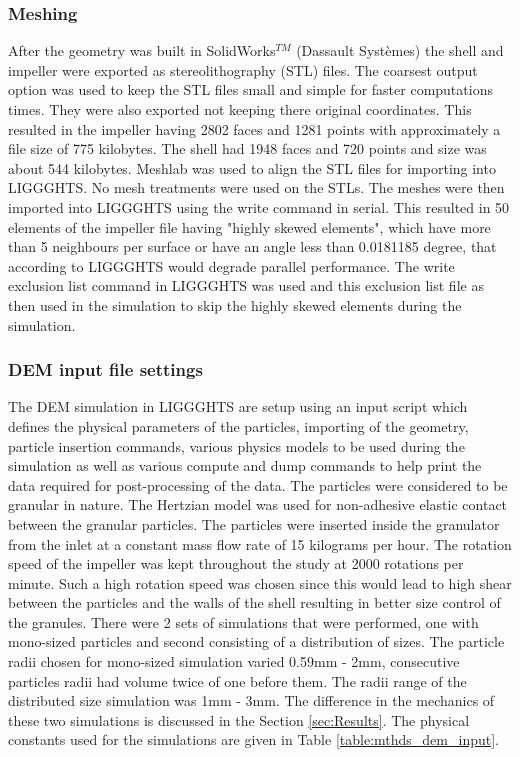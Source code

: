 \documentclass[preprint,11pt,authoryear]{elsarticle}
\begin{document}
\subsubsection{Meshing}
 After the geometry was built in SolidWorks$^{TM}$ (Dassault Syst\`{e}mes) the shell and impeller 
were exported as stereolithography (STL) files. The coarsest output option was used to keep the STL files small and 
simple for faster computations times. They were also exported not keeping there original coordinates.  
This resulted in the impeller having 2802 faces and 1281 points with approximately a file size of 775 
kilobytes. The shell had 1948 faces and 720 points and size was about 544 kilobytes.  
 Meshlab was used to align the STL files for importing into LIGGGHTS. No mesh treatments were 
used on the STLs. 
 The meshes were then imported into LIGGGHTS using the write command in serial. This resulted 
in 50 elements of the impeller file having "highly skewed elements", which have more than 5 
neighbours per surface or have an angle less than 0.0181185 degree, that according to LIGGGHTS 
would degrade parallel performance. The write exclusion list command in LIGGGHTS was used and 
this exclusion list file as then used in the simulation to skip the highly skewed elements during the 
simulation. 

\subsubsection{DEM input file settings}
The DEM simulation in LIGGGHTS are setup using an input script which defines the physical 
parameters of the particles, importing of the geometry, particle insertion commands, various physics 
models to be used during the simulation as well as various compute and dump commands to help print 
the data required for post-processing of the data. The particles were considered to be granular in 
nature. The Hertzian model was used for non-adhesive elastic contact between the granular particles. 
The particles were inserted inside the granulator from the inlet at a constant mass flow rate of 15 
kilograms per hour. The rotation speed of the impeller was kept throughout the study at 2000 rotations 
per minute. Such a high rotation speed was chosen since this would lead to high shear between the 
particles and the walls of the shell resulting in better size control of the granules. There were 2 sets of 
simulations that were performed, one with mono-sized particles and second consisting of a distribution 
of sizes. The particle radii chosen for mono-sized simulation varied 0.59mm - 2mm, consecutive 
particles radii had volume twice of one before them. The radii range of the distributed size simulation 
was 1mm - 3mm. The difference in the mechanics of these two simulations is discussed in the Section \ref{sec:Results}. 
The physical constants used for the simulations are given in Table 
\ref{table:mthds_dem_input}.
\end{document}

